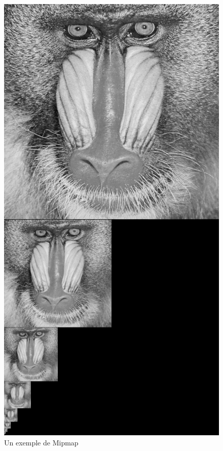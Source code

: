 \begin{figure}[h!]
\centering
\caption{Un exemple de Mipmap}
\includegraphics[scale=0.4]{MipMap_real} %
\end{figure}

